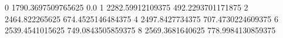 0 1790.3697509765625 0.0
1 2282.59912109375 492.2293701171875
2 2464.822265625 674.4525146484375
4 2497.8427734375 707.4730224609375
6 2539.4541015625 749.0843505859375
8 2569.3681640625 778.9984130859375
